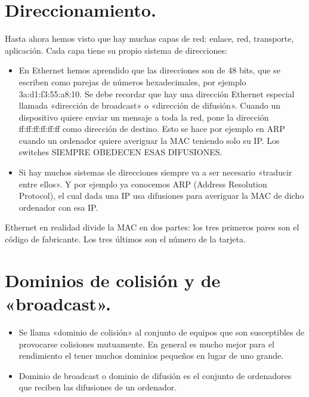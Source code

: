 \documentclass[letterpaper,10pt,spanish]{sphinxmanual}
\begin{document}
\section{Direccionamiento.}
\label{\detokenize{t2_integracion_elementos/apuntes_t2:direccionamiento}}
\sphinxAtStartPar
Hasta ahora hemos visto que hay muchas capas de red: enlace, red, transporte, aplicación. Cada capa tiene su propio sistema de direcciones:
\begin{itemize}
\item {} 
\sphinxAtStartPar
En Ethernet hemos aprendido que las direcciones son de 48 bits, que se escriben como parejas de números hexadecimales, por ejemplo 3a:d1:f3:55:a8:10. Se debe recordar que hay una dirección Ethernet especial llamada «dirección de broadcast» o «dirección de difusión». Cuando un dispositivo quiere enviar un mensaje a toda la red, pone la dirección ff:ff:ff:ff:ff:ff como dirección de destino. Esto se hace por ejemplo en ARP cuando un ordenador quiere averiguar la MAC teniendo solo su IP. Los switches SIEMPRE OBEDECEN ESAS DIFUSIONES.

\item {} 
\sphinxAtStartPar
Si hay muchos sistemas de direcciones siempre va a ser necesario «traducir entre ellos». Y por ejemplo ya conocemos ARP (Address Resolution Protocol), el cual dada una IP usa difusiones para averiguar la MAC de dicho ordenador con esa IP.

\end{itemize}

\sphinxAtStartPar
Ethernet en realidad divide la MAC en dos partes: los tres primeros pares son el código de fabricante. Los tres últimos son el número de la tarjeta.


\section{Dominios de colisión y de «broadcast».}
\label{\detokenize{t2_integracion_elementos/apuntes_t2:dominios-de-colision-y-de-broadcast}}\begin{itemize}
\item {} 
\sphinxAtStartPar
Se llama «dominio de colisión» al conjunto de equipos que son susceptibles de provocarse colisiones mutuamente. En general es mucho mejor para el rendimiento el tener muchos dominios pequeños en lugar de uno grande.

\item {} 
\sphinxAtStartPar
Dominio de broadcast o dominio de difusión es el conjunto de ordenadores que reciben las difusiones de un ordenador.

\end{itemize}
\end{document}
